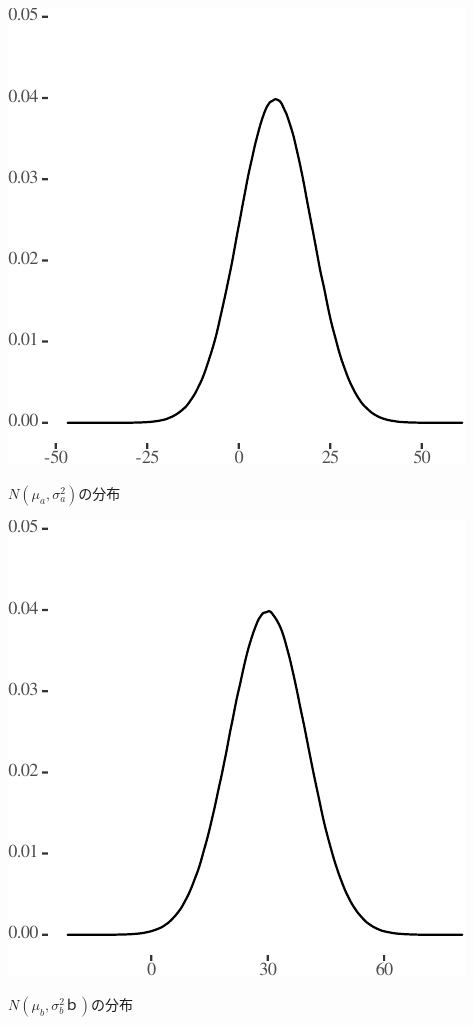 \documentclass[a4paper]{tufte-handout}
\begin{document}
\begin{marginfigure}

{\centering \includegraphics{AdditivityOfVariance_files/figure-latex/unnamed-chunk-2-1} 

}

\caption[$N(\mu_a, \sigma^2_a)$の分布]{$N(\mu_a, \sigma^2_a)$の分布}\label{fig:unnamed-chunk-2}
\end{marginfigure}

\begin{marginfigure}

{\centering \includegraphics{AdditivityOfVariance_files/figure-latex/unnamed-chunk-3-1} 

}

\caption[$N(\mu_b, \sigma^2_bｂ)$の分布]{$N(\mu_b, \sigma^2_bｂ)$の分布}\label{fig:unnamed-chunk-3}
\end{marginfigure}
\end{document}
